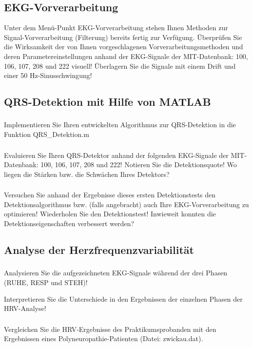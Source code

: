 \documentclass[a4paper,12pt,titlepage]{scrartcl}
\begin{document}
\subsection{EKG-Vorverarbeitung}
Unter dem Menü-Punkt EKG-Vorverarbeitung stehen Ihnen Methoden zur Signal-Vorverarbeitung (Filterung) bereits fertig zur Verfügung.
Überprüfen Sie die Wirksamkeit der von Ihnen vorgeschlagenen Vorverarbeitungsmethoden und deren Parametereinstellungen anhand der EKG-Signale der MIT-Datenbank: 100, 106, 107, 208 und 222 visuell! Überlagern Sie die Signale mit einem Drift und einer 50 Hz-Sinusschwingung!

\subsection{QRS-Detektion mit Hilfe von MATLAB}
\subsubsection{}
Implementieren Sie Ihren entwickelten Algorithmus zur QRS-Detektion in die Funktion QRS\_Detektion.m

\subsubsection{}
Evaluieren Sie Ihren QRS-Detektor anhand der folgenden EKG-Signale der MIT-Datenbank: 100, 106, 107, 208 und 222! Notieren Sie die Detektionsquote! Wo liegen die Stärken bzw. die Schwächen Ihres Detektors?

\subsubsection{}
Versuchen Sie anhand der Ergebnisse dieses ersten Detektionstests den Detektionsalgorithmus bzw. (falls angebracht) auch Ihre EKG-Vorverarbeitung zu optimieren! Wiederholen Sie den Detektionstest! Inwieweit konnten die Detektionseigenschaften verbessert werden?

\subsection{Analyse der Herzfrequenzvariabilität}
\subsubsection{}
Analysieren Sie die aufgezeichneten EKG-Signale während der drei Phasen (RUHE, RESP und STEH)!

Interpretieren Sie die Unterschiede in den Ergebnissen der einzelnen Phasen der HRV-Analyse!

\subsubsection{}
Vergleichen Sie die HRV-Ergebnisse des Praktikumsprobanden mit den Ergebnissen eines Polyneuropathie-Patienten (Datei: zwickau.dat).
\end{document}
